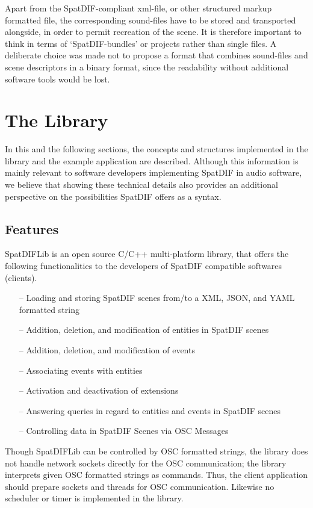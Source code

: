 \documentclass[a4paper]{article}
\begin{document}
Apart from the SpatDIF-compliant xml-file, or other structured markup formatted file, the corresponding sound-files have to be stored and transported alongside, in order to permit recreation of the scene.
It is therefore important to think in terms of `SpatDIF-bundles' or projects rather than single files.
A deliberate choice was made not to propose a format that combines sound-files and scene descriptors in a binary format, since the readability without additional software tools would be lost.

\section{The Library} %

In this and the following sections, the concepts and structures implemented in the library and the example application are described.
Although this information is mainly relevant to software developers implementing SpatDIF in audio software, we believe that showing these technical details also provides an additional perspective on the possibilities SpatDIF offers as a syntax.

\subsection{Features}
SpatDIFLib is an open source C/C++ multi-platform library, that offers the following functionalities to the developers of SpatDIF compatible softwares (clients).

\begin{itemize}[leftmargin=*]
\item[--] Loading and storing SpatDIF scenes from/to a XML, JSON, and YAML formatted string
\item[--] Addition, deletion, and modification of entities in SpatDIF scenes
\item[--] Addition, deletion, and modification of events
\item[--] Associating events with entities
\item[--] Activation and deactivation of extensions
\item[--] Answering queries in regard to entities and events in SpatDIF scenes
\item[--] Controlling data in SpatDIF Scenes via OSC Messages
\end{itemize}

Though SpatDIFLib can be controlled by OSC \cite{Wessel_2002, Schmeder_2008} formatted strings, the library does not handle network sockets directly for the OSC communication; the library interprets given OSC formatted strings as commands. Thus, the client application should prepare sockets and threads for OSC communication. Likewise no scheduler or timer is implemented in the library. 
  
\end{document}
